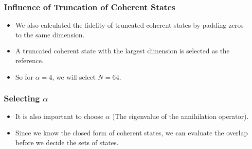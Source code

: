 \documentclass{beamer}
\begin{document}
\begin{frame}
  \frametitle{Influence of Truncation of Coherent States}
  \begin{itemize}
    \item We also calculated the fidelity of truncated
          coherent states by padding zeros to the same dimension.
    \item A truncated coherent state with the largest dimension
          is selected as the reference.
    \item So for $\alpha = 4$, we will select $N = 64$.
  \end{itemize}
  \begin{table}[ht]
    \centering
    \caption{Fidelity of $\ket{\alpha}$ w.r.t N = 1024 ($\alpha = 4$)}
    \label{tab:fock-fidelity}
  \end{table}
\end{frame}

\begin{frame}
  \frametitle{Selecting $\alpha$}
  \begin{itemize}
    \item It is also important to choose $\alpha$ (The eigenvalue of the
          annihilation operator).
    \item Since we know the closed form of coherent states, we can evaluate
          the overlap before we decide the sets of states.
  \end{itemize}
\end{frame}
\end{document}
